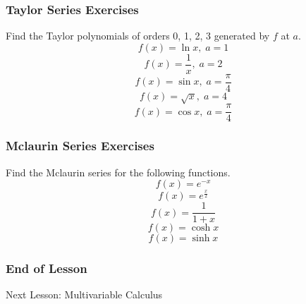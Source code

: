 \documentclass[xcolor=dvipsnames]{beamer}
\begin{document}
  \begin{frame}
    \frametitle{Taylor Series Exercises}
Find the Taylor polynomials of orders 0, 1, 2, 3 generated by $f$
at $a$.
\begin{equation}
\label{eq:chaithie}
f(x)=\ln{}x,\;a=1
\end{equation}
\begin{equation}
\label{eq:oorohkao}
f(x)=\frac{1}{x},\;a=2
\end{equation}
\begin{equation}
\label{eq:foigacoo}
f(x)=\sin{}x,\;a=\frac{\pi}{4}
\end{equation}
\begin{equation}
\label{eq:sishahgh}
f(x)=\sqrt{x},\;a=4
\end{equation}
\begin{equation}
  \label{eq:eighetog}
f(x)=\cos{}x,\;a=\frac{\pi}{4}
\end{equation}
\end{frame}

\begin{frame}
  \frametitle{Mclaurin Series Exercises}
  Find the Mclaurin series for the following functions.
  \begin{equation}
    \label{eq:oxishait}
    f(x)=e^{-x}
  \end{equation}
  \begin{equation}
    \label{eq:chuyeeye}
    f(x)=e^{\frac{x}{2}}
  \end{equation}
  \begin{equation}
    \label{eq:queiyuif}
    f(x)=\frac{1}{1+x}
  \end{equation}
  \begin{equation}
    \label{eq:aoyahphe}
    f(x)=\cosh{}x
  \end{equation}
  \begin{equation}
    \label{eq:ahtoilei}
    f(x)=\sinh{}x
  \end{equation}
\end{frame}

\begin{frame}
  \frametitle{End of Lesson}
Next Lesson: Multivariable Calculus
\end{frame}
\end{document}

